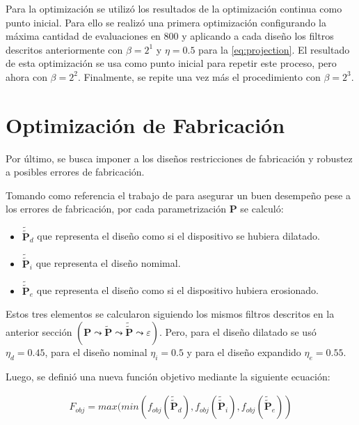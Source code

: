 Para la optimización se utilizó los resultados de la optimización continua como punto inicial.
Para ello se realizó una primera optimización configurando la máxima cantidad de evaluaciones 
en 800 y aplicando a cada diseño los filtros descritos anteriormente con $\beta = 2^1$ y $\eta = 0.5$
para la \autoref{eq:projection}.
El resultado de esta optimización se usa como punto inicial para repetir este proceso, pero ahora con $\beta
= 2^2$. Finalmente, se repite una vez más el procedimiento con $\beta = 2^3$.

\section{Optimización de Fabricación}

Por último, se busca imponer a los diseños restricciones de fabricación y robustez a posibles errores
de fabricación. 

Tomando como referencia el trabajo de \cite{Hammond20} para asegurar un buen desempeño pese a los errores de
fabricación, por cada parametrización $\boldsymbol{P}$ se calculó:

\begin{itemize}
  \item $\widetilde{\widetilde{\boldsymbol{P}}}_{d}$ que representa el diseño como si el dispositivo se hubiera dilatado.
  \item $\widetilde{\widetilde{\boldsymbol{P}}}_{i}$ que representa el diseño nomimal.
  \item $\widetilde{\widetilde{\boldsymbol{P}}}_{e}$  que representa el diseño como si el dispositivo
    hubiera erosionado.
\end{itemize}

Estos tres elementos se calcularon siguiendo los mismos filtros descritos en la anterior sección
$(\boldsymbol{P} \mathrel{\leadsto} \widetilde{\boldsymbol{P}} \mathrel{\leadsto}
\widetilde{\widetilde{\boldsymbol{P}}} \mathrel{\leadsto} \varepsilon)$.
Pero, para el diseño dilatado se usó $\eta_d = 0.45$, para el diseño nominal $\eta_i = 0.5$ y
para el diseño expandido $\eta_e = 0.55$.

Luego, se definió una nueva función objetivo mediante la siguiente ecuación:

\begin{equation}
  \begin{split}
    F_{obj} = max(min(
    f_{obj}(\widetilde{\widetilde{\boldsymbol{P}}}_{d}),
    f_{obj}(\widetilde{\widetilde{\boldsymbol{P}}}_{i}),
    f_{obj}(\widetilde{\widetilde{\boldsymbol{P}}}_{e})
    )
  \end{split}
  \label{eq:final-fom}
\end{equation}

